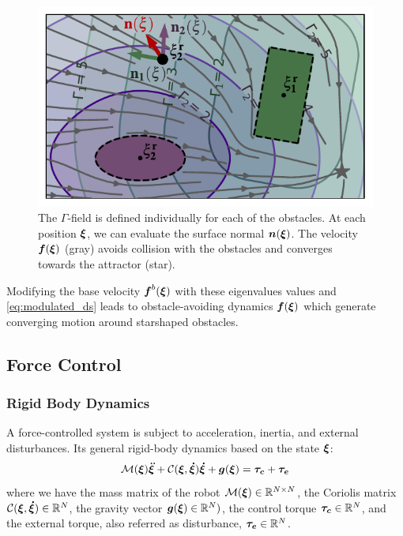 \begin{figure}[b]
\iflong
\centerline{\includegraphics[width=0.95\columnwidth]{figures/normal_and_gamma_field_visualization_annotated.pdf}}
\else
\centerline{}
\fi
\caption{
The $\Gamma$-field is defined individually for each of the obstacles. At each position $\boldsymbol{\xi}$, we can evaluate the surface normal $\boldsymbol{n}(\boldsymbol{\xi})$. 
The velocity $\boldsymbol{f}(\boldsymbol{\xi})$ (gray) avoids collision with the obstacles and converges towards the attractor (star).}
\label{fig:resultant_normal}
\end{figure}

\iflong
Modifying the base velocity $\boldsymbol{f}^b(\boldsymbol{\xi})$ with these eigenvalues values and \eqref{eq:modulated_ds} leads to obstacle-avoiding dynamics $\boldsymbol{f}(\boldsymbol{\xi})$ which generate converging motion around starshaped obstacles.
\fi

\subsection{Force Control}

\subsubsection{Rigid Body Dynamics}
A force-controlled system is subject to acceleration, inertia, and external disturbances. Its general rigid-body dynamics based on the state $\boldsymbol{\xi}$: 
\begin{equation}
\mathcal{M}(\boldsymbol{\xi})\boldsymbol{\ddot\xi} + \mathcal{C}(\boldsymbol{\xi}, \boldsymbol{\dot\xi})\boldsymbol{\dot\xi} + \boldsymbol{g}(\boldsymbol{\xi}) = \boldsymbol{\tau_c} + \boldsymbol{\tau_e}
 \label{eq:robot_dynamics}
\end{equation}
where we have the mass matrix of the robot $\mathcal{M}(\boldsymbol{\xi}) \in \mathbb{R}^{N \times N}$, the Coriolis matrix $\mathcal{C}(\boldsymbol{\xi},\boldsymbol{\dot\xi}) \in \mathbb{R}^N$, the gravity vector $\boldsymbol{g}(\boldsymbol{\xi}) \in \mathbb{R}^N)$, the control torque $\boldsymbol{\tau_c} \in \mathbb{R}^N$, and the external torque, also referred as disturbance, $\boldsymbol{\tau_e} \in \mathbb{R}^N$.

